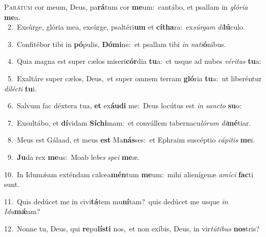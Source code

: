 \lettrine{\initial\textcolor{\initialcolor}{P}}{arátum} cor meum, Deus, pa\-\textbf{rá}\-tum cor \textbf{me}\-um:~\star cantábo, et psallam in \textit{gló}\-\textit{ri}\textit{a} \textbf{me}\-a.\\
{\numbfont\textcolor{\numbcolor}{~2.}}~Exsúrge, glória mea, exsúrge, psaltéri\textbf{um} et \textbf{cí}\-\textbf{tha}ra:~\star ex\-\textit{súr}\-\textit{gam} \textit{di}\-\textbf{lú}culo.\par
{\numbfont\textcolor{\numbcolor}{~3.}}~Confitébor tibi in \textbf{pó}\-pulis, \textbf{Dó}\-\textbf{mi}ne:~\star et psallam tibi \textit{in} \textit{na}\-\textit{ti}\textbf{ó}nibus.\par
{\numbfont\textcolor{\numbcolor}{~4.}}~Quia magna est super cælos miseri\-\textbf{cór}\-dia \textbf{tu}\-a:~\star et usque ad nubes \textit{vé}\-\textit{ri}\textit{tas} \textbf{tu}\-a:\par
{\numbfont\textcolor{\numbcolor}{~5.}}~Exaltáre super cælos, Deus,~\dagger et super omnem terram \textbf{gló}\-ria \textbf{tu}\-a:~\star ut liberéntur \textit{di}\-\textit{léc}\textit{ti} \textbf{tu}\-i.\par
{\numbfont\textcolor{\numbcolor}{~6.}}~Salvum fac déxtera tua, \textbf{et} ex\-\textbf{áu}\-\textbf{di} me:~\star Deus locútus est \textit{in} \textit{sanc}\-\textit{to} \textbf{su}\-o:\par
{\numbfont\textcolor{\numbcolor}{~7.}}~Exsultábo, et \textbf{dí}\-vidam \textbf{Sí}\-\textbf{chi}mam:~\star et convállem tabernacu\-\textit{ló}\-\textit{rum} \textit{di}\-\textbf{mé}tiar.\par
{\numbfont\textcolor{\numbcolor}{~8.}}~Meus est Gálaad, et meus \textbf{est} Ma\-\textbf{nás}\-ses:~\star et Ephraim suscéptio \textit{cá}\-\textit{pi}\textit{tis} \textbf{me}\-i.\par
{\numbfont\textcolor{\numbcolor}{~9.}}~\-\textbf{Ju}\-da rex \textbf{me}\-us:~\star Moab le\textit{bes} \textit{spe}\-\textit{i} \textbf{me}\-æ.\par
{\numbfont\textcolor{\numbcolor}{10.}}~In Idumǽam exténdam calcea\-\textbf{mén}\-tum \textbf{me}\-um:~\star mihi alienígenæ \textit{a}\-\textit{mí}\textit{ci} \textbf{fac}\-ti sunt.\par
{\numbfont\textcolor{\numbcolor}{11.}}~Quis dedúcet me in civi\-\textbf{tá}\-tem mu\-\textbf{ní}\-tam?~\star quis dedúcet me usque \textit{in} \textit{I}\-\textit{du}\textbf{mǽ}am?\par
{\numbfont\textcolor{\numbcolor}{12.}}~Nonne tu, Deus, qui \textbf{re}\-pu\-\textbf{lís}\-\textbf{ti} nos,~\star et non exíbis, Deus, in vir\-\textit{tú}\-\textit{ti}\textit{bus} \textbf{nos}\-tris?\par
